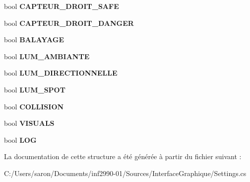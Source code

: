 \begin{DoxyCompactItemize}
\item 
\hypertarget{struct_interface_graphique_1_1_debug_settings_a9df407276c9b964beb4a14d522b8993d}{bool {\bfseries C\-A\-P\-T\-E\-U\-R\-\_\-\-D\-R\-O\-I\-T\-\_\-\-S\-A\-F\-E}}\label{struct_interface_graphique_1_1_debug_settings_a9df407276c9b964beb4a14d522b8993d}

\item 
\hypertarget{struct_interface_graphique_1_1_debug_settings_a8d054c6388e0d820b180372f1a0b39a6}{bool {\bfseries C\-A\-P\-T\-E\-U\-R\-\_\-\-D\-R\-O\-I\-T\-\_\-\-D\-A\-N\-G\-E\-R}}\label{struct_interface_graphique_1_1_debug_settings_a8d054c6388e0d820b180372f1a0b39a6}

\item 
\hypertarget{struct_interface_graphique_1_1_debug_settings_a110f3aae6609185d444a012be5e86309}{bool {\bfseries B\-A\-L\-A\-Y\-A\-G\-E}}\label{struct_interface_graphique_1_1_debug_settings_a110f3aae6609185d444a012be5e86309}

\item 
\hypertarget{struct_interface_graphique_1_1_debug_settings_a07f4747fb435a7959bc236f552383f5d}{bool {\bfseries L\-U\-M\-\_\-\-A\-M\-B\-I\-A\-N\-T\-E}}\label{struct_interface_graphique_1_1_debug_settings_a07f4747fb435a7959bc236f552383f5d}

\item 
\hypertarget{struct_interface_graphique_1_1_debug_settings_a283e94913976da3793a18e72c86617c4}{bool {\bfseries L\-U\-M\-\_\-\-D\-I\-R\-E\-C\-T\-I\-O\-N\-N\-E\-L\-L\-E}}\label{struct_interface_graphique_1_1_debug_settings_a283e94913976da3793a18e72c86617c4}

\item 
\hypertarget{struct_interface_graphique_1_1_debug_settings_a891cecb02b52f767f92b54dc14415d16}{bool {\bfseries L\-U\-M\-\_\-\-S\-P\-O\-T}}\label{struct_interface_graphique_1_1_debug_settings_a891cecb02b52f767f92b54dc14415d16}

\item 
\hypertarget{struct_interface_graphique_1_1_debug_settings_a4ea80236bb07b658d198fa8b14c43035}{bool {\bfseries C\-O\-L\-L\-I\-S\-I\-O\-N}}\label{struct_interface_graphique_1_1_debug_settings_a4ea80236bb07b658d198fa8b14c43035}

\item 
\hypertarget{struct_interface_graphique_1_1_debug_settings_a53ce941b4d73fdf11207a6e0e5ae9349}{bool {\bfseries V\-I\-S\-U\-A\-L\-S}}\label{struct_interface_graphique_1_1_debug_settings_a53ce941b4d73fdf11207a6e0e5ae9349}

\item 
\hypertarget{struct_interface_graphique_1_1_debug_settings_ad329183eb6d948106c00e591df7ad0d2}{bool {\bfseries L\-O\-G}}\label{struct_interface_graphique_1_1_debug_settings_ad329183eb6d948106c00e591df7ad0d2}

\end{DoxyCompactItemize}


La documentation de cette structure a été générée à partir du fichier suivant \-:\begin{DoxyCompactItemize}
\item 
C\-:/\-Users/saron/\-Documents/inf2990-\/01/\-Sources/\-Interface\-Graphique/Settings.\-cs\end{DoxyCompactItemize}

